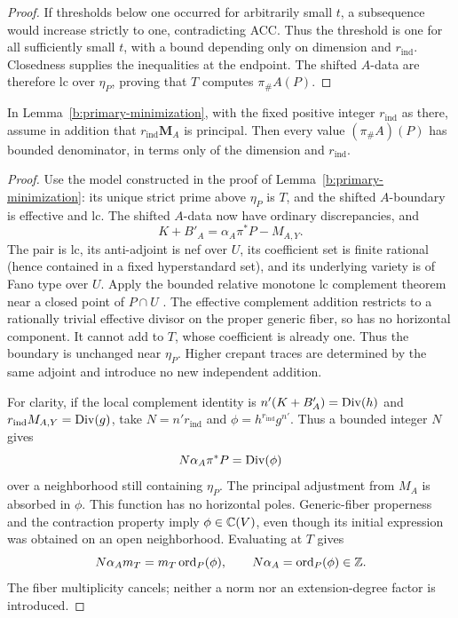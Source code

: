 \begin{proof}
If thresholds below one occurred for arbitrarily small \(t\), a
subsequence would increase strictly to one, contradicting ACC.
Thus the threshold is one for all sufficiently small \(t\), with a
bound depending only on dimension and \(r_{\mathrm{ind}}\). Closedness supplies the
inequalities at the endpoint. The shifted \(A\)-data are therefore
lc over \(\eta_P\), proving that \(T\) computes \(\pi_\#A(P)\).
\end{proof}

\begin{corollary}\label{b:principal-denominators}
In Lemma~\ref{b:primary-minimization}, with the fixed positive integer
\(r_{\mathrm{ind}}\) as there, assume in addition that
\(r_{\mathrm{ind}}\mathbf M_A\) is principal. Then every value \((\pi_\#A)(P)\)
has bounded denominator, in terms only of the dimension and \(r_{\mathrm{ind}}\).
\end{corollary}

\begin{proof}
Use the model constructed in the proof of
Lemma~\ref{b:primary-minimization}: its unique strict prime above \(\eta_P\) is
\(T\), and the shifted \(A\)-boundary is effective and lc. The
shifted \(A\)-data now have ordinary discrepancies, and
\[
                 K+B'_A=\alpha_A\pi^*P-M_{A,Y}.
\]
The pair is lc, its anti-adjoint is nef over \(U\), its coefficient
set is finite rational (hence contained in a fixed hyperstandard
set), and its underlying variety is of Fano type over \(U\).
Apply the bounded relative monotone lc complement theorem near a
closed point of \(P\cap U\)
\cite[Theorem 1.8]{BirkarComplements}.
The effective complement addition restricts to a rationally trivial
effective divisor on the proper generic fiber, so has no horizontal
component. It cannot add to \(T\), whose coefficient is already one.
Thus the boundary is unchanged near \(\eta_P\). Higher crepant
traces are determined by the same adjoint and introduce no new
independent addition.

For clarity, if the local complement identity is
\(n'(K+B'_A)=\operatorname{Div}(h)\) and
\(r_{\mathrm{ind}}M_{A,Y}=\operatorname{Div}(g)\), take
\(N=n'r_{\mathrm{ind}}\) and \(\phi=h^{r_{\mathrm{ind}}}g^{n'}\).
Thus a bounded integer \(N\) gives
\[
                   N\alpha_A\pi^*P=\operatorname{Div}(\phi)
\]
over a neighborhood still containing \(\eta_P\).
The principal adjustment from \(M_A\) is absorbed in \(\phi\).
This function has no horizontal poles. Generic-fiber properness and
the contraction property imply \(\phi\in\mathbb C(V)\), even though its
initial expression was obtained on an open neighborhood.
Evaluating at \(T\) gives
\[
           N\alpha_A m_T=m_T\operatorname{ord}_P(\phi),
             \qquad N\alpha_A=\operatorname{ord}_P(\phi)\in\mathbb Z.
\]
The fiber multiplicity cancels; neither a norm nor an extension-degree
factor is introduced.
\end{proof}

